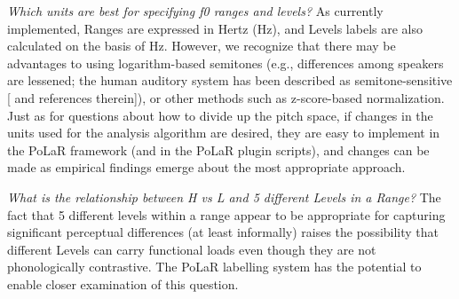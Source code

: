 \documentclass[11pt, twoside]{memoir}
\begin{document}
\textit{Which units are best for specifying f0 ranges and levels?} As currently implemented, Ranges are expressed in Hertz (Hz), and Levels labels are also calculated on the basis of Hz. However, we recognize that there may be advantages to using logarithm-based semitones (e.g., differences among speakers are lessened; the human auditory system has been described as semitone-sensitive [\citealt{nolan03} and references therein]), or other methods such as z-score-based normalization. Just as for questions about how to divide up the pitch space, if changes in the units used for the analysis algorithm are desired, they are easy to implement in the PoLaR framework (and in the PoLaR plugin scripts), and changes can be made as empirical findings emerge about the most appropriate approach.

\textit{What is the relationship between H vs L and 5 different Levels in a Range?}  The fact that 5 different levels within a range appear to be appropriate for capturing significant perceptual differences (at least informally) raises the possibility that different Levels can carry functional loads even though they are not phonologically contrastive.  The PoLaR labelling system has the potential to enable closer examination of this question.
%
%
\end{document}
